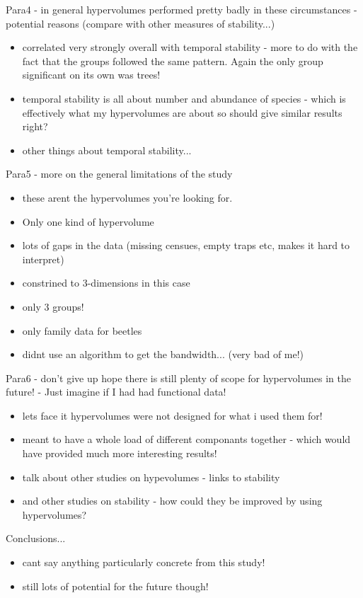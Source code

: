 Para4 - in general hypervolumes performed pretty badly in these circumstances - potential reasons (compare with other measures of stability...)
\begin{itemize}
	\item correlated very strongly overall with temporal stability - more to do with the fact that the groups followed the same pattern. Again the only group significant on its own was trees!
	\item temporal stability is all about number and abundance of species - which is effectively what my hypervolumes are about so should give similar results right?
	\item other things about temporal stability...
\end{itemize}

Para5 - more on the general limitations of the study
\begin{itemize}
	\item these arent the hypervolumes you're looking for.
	\item Only one kind of hypervolume
	\item lots of gaps in the data (missing censues, empty traps etc, makes it hard to interpret)
	\item constrined to 3-dimensions in this case
	\item only 3 groups!
	\item only family data for beetles
	\item didnt use an algorithm to get the bandwidth... (very bad of me!)
\end{itemize}

Para6 - don't give up hope there is still plenty of scope for hypervolumes in the future! - Just imagine if I had had functional data!
\begin{itemize}
	\item lets face it hypervolumes were not designed for what i used them for!
	\item meant to have a whole load of different componants together - which would have provided much more interesting results!
	\item talk about other studies on hypevolumes - links to stability
	\item and other studies on stability - how could they be improved by using hypervolumes?
\end{itemize}


Conclusions...
\begin{itemize}
	\item cant say anything particularly concrete from this study!
	\item still lots of potential for the future though!
\end{itemize}